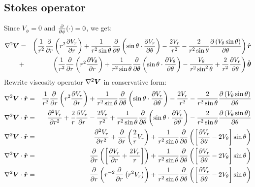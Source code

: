 \subsection{Stokes operator}
Since $V_\phi = 0$ and $\frac{\partial }{\partial \phi}(\cdot) = 0$, we get:
\begin{eqnarray}
\nabla^2 \boldsymbol{V} &=& \left(
\frac{1}{r^2}\frac{\partial }{\partial r}\left( r^2 \frac{\partial V_r}{\partial r} \right) + \frac{1}{r^2 \sin\theta} \frac{\partial }{\partial \theta} \left( \sin\theta \cdot \frac{\partial V_r}{\partial \theta}\right)
 - \frac{2V_r}{r^2} - \frac{2}{r^2 \sin\theta} \frac{\partial \left(V_\theta \sin\theta \right)}{\partial \theta}\right)\hat{\boldsymbol{r}} \\
&+& \left(
\frac{1}{r^2}\frac{\partial }{\partial r}\left( r^2 \frac{\partial V_\theta}{\partial r} \right) + \frac{1}{r^2 \sin\theta} \frac{\partial }{\partial \theta} \left( \sin\theta \cdot \frac{\partial V_\theta}{\partial \theta}\right)
 - \frac{V_\theta}{r^2 \sin^2\theta} + \frac{2}{r^2}\frac{\partial V_r}{\partial \theta}\right) \hat{\boldsymbol{\theta}}
\end{eqnarray}
Rewrite viscosity operator $\nabla^2 \boldsymbol{V}$ in conservative form:
\begin{eqnarray}
\nabla^2 \boldsymbol{V} \cdot \hat{\boldsymbol{r}} &=& 
\frac{1}{r^2}\frac{\partial }{\partial r}\left( r^2 \frac{\partial V_r}{\partial r} \right) + \frac{1}{r^2 \sin\theta} \frac{\partial }{\partial \theta} \left( \sin\theta \cdot \frac{\partial V_r}{\partial \theta}\right)
 - \frac{2V_r}{r^2} - \frac{2}{r^2 \sin\theta} \frac{\partial \left(V_\theta \sin\theta \right)}{\partial \theta}
\\
\nabla^2 \boldsymbol{V} \cdot \hat{\boldsymbol{r}} &=& 
 \frac{\partial ^2V_r}{\partial r^2} + \frac{2}{r} \frac{\partial V_r}{\partial r}
 - \frac{2V_r}{r^2}
 + \frac{1}{r^2 \sin\theta} \frac{\partial }{\partial \theta} \left( \sin\theta \cdot \frac{\partial V_r}{\partial \theta}\right)
 - \frac{2}{r^2 \sin\theta} \frac{\partial \left(V_\theta \sin\theta \right)}{\partial \theta} 
\\
\nabla^2 \boldsymbol{V} \cdot \hat{\boldsymbol{r}} &=& 
 \frac{\partial ^2V_r}{\partial r^2} +
  \frac{\partial }{\partial r}\left(\frac{2}{r} V_r\right)
 + \frac{1}{r^2 \sin\theta} \frac{\partial }{\partial \theta} 
 \left( \left[\frac{\partial V_r}{\partial \theta} - 2 V_\theta \right] \sin\theta \right)
\\
\nabla^2 \boldsymbol{V} \cdot \hat{\boldsymbol{r}} &=&
 \frac{\partial }{\partial r} \left(\left[\frac{\partial V_r}{\partial r} + \frac{2 V_r}{r}\right]
 \right)
 + \frac{1}{r^2 \sin\theta} \frac{\partial }{\partial \theta}
 \left( \left[\frac{\partial V_r}{\partial \theta} - 2 V_\theta \right] \sin\theta \right)
\\
\nabla^2 \boldsymbol{V} \cdot \hat{\boldsymbol{r}} &=&
 \frac{\partial }{\partial r} \left(r^{-2}\frac{\partial }{\partial r}\left(r^2 V_r\right)
 \right)
 + \frac{1}{r^2 \sin\theta} \frac{\partial }{\partial \theta}
 \left( \left[\frac{\partial V_r}{\partial \theta} - 2 V_\theta \right] \sin\theta \right)
\end{eqnarray}
